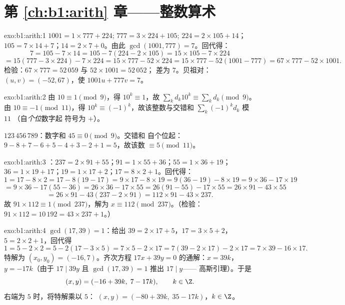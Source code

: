 \section*{第 \ref{ch:b1:arith} 章——整数算术}

\begin{solution}{exo:b1:arith:1}
$1001 = 1 \times 777 + 224$; $777 = 3 \times 224 + 105$; $224 = 2
\times 105 + 14$；$105 = 7 \times 14 + 7$；$14 = 2 \times 7 + 0$。由此
$\gcd(1001, 777) = 7$。回代得：
\[
7 = 105 - 7 \times 14
= 105 - 7(224 - 2\times 105) = 15 \times 105 - 7 \times 224
\]
\[
= 15(777 - 3\times 224) - 7\times 224 = 15 \times 777 - 52 \times 224
= 15 \times 777 - 52(1001 - 777) = 67 \times 777 - 52 \times 1001 .
\]
检验：$67 \times 777 = 52\,059$ 与 $52 \times 1001 = 52\,052$；
差为 $7$。贝祖对：$(u, v) = (-52, 67)$，使 $1001u + 777v =
7$。
\end{solution}

\begin{solution}{exo:b1:arith:2}
由 $10 \equiv 1 \pmod 9$，得 $10^k \equiv 1$，故 $\sum_k d_k 10^k
\equiv \sum_k d_k \pmod 9$。由 $10 \equiv -1 \pmod{11}$，得 $10^k
\equiv (-1)^k$，故该整数与交错和
$\sum_k (-1)^k d_k$ 模 $11$ （自\emph{个位}数字起
符号为 $+$）。

$123\,456\,789$：数字和 $45 \equiv 0 \pmod 9$。交错和
自个位起：$9 - 8 + 7 - 6 + 5 - 4 + 3 - 2 + 1 = 5$，故该数
$\equiv 5 \pmod{11}$。
\end{solution}

\begin{solution}{exo:b1:arith:3}
：$237 = 2 \times 91 + 55$；$91 = 1 \times 55 + 36$；$55 = 1
\times 36 + 19$；$36 = 1 \times 19 + 17$；$19 = 1 \times 17 + 2$；$17
= 8 \times 2 + 1$。回代得：
\[
1 = 17 - 8\times 2 = 17 - 8(19 - 17) = 9\times 17 - 8\times 19
= 9(36 - 19) - 8\times 19 = 9\times 36 - 17\times 19
\]
\[
= 9\times 36 - 17(55 - 36) = 26\times 36 - 17\times 55
= 26(91 - 55) - 17\times 55 = 26\times 91 - 43\times 55
\]
\[
= 26\times 91 - 43(237 - 2\times 91) = 112 \times 91 - 43 \times 237.
\]
故 $91 \times 112 \equiv 1 \pmod{237}$，解为 $x \equiv
112 \pmod{237}$。（检验：$91 \times 112 = 10\,192 = 43 \times 237 +
1$。）
\end{solution}

\begin{solution}{exo:b1:arith:4}
$\gcd(17, 39) = 1$：给出 $39 = 2\times 17 + 5$，$17 = 3\times
5 + 2$，$5 = 2\times 2 + 1$，回代得
\[
1 = 5 - 2\times 2 = 5 - 2(17 - 3\times 5) = 7\times 5 - 2\times 17
= 7(39 - 2\times 17) - 2\times 17 = 7\times 39 - 16\times 17 .
\]
特解为 $(x_0, y_0) = (-16, 7)$。齐次方程
$17x + 39y = 0$ 的通解：$x = 39k$，$y = -17k$（由于
$17 \mid 39y$ 且 $\gcd(17,39) = 1$ 推出 $17 \mid y$——
高斯引理）。于是
\[
(x, y) = (-16 + 39k,\; 7 - 17k), \qquad k \in \Z .
\]
右端为 $5$ 时，将特解乘以 $5$：
$(x, y) = (-80 + 39k,\; 35 - 17k)$，$k \in \Z$。
\end{solution}

